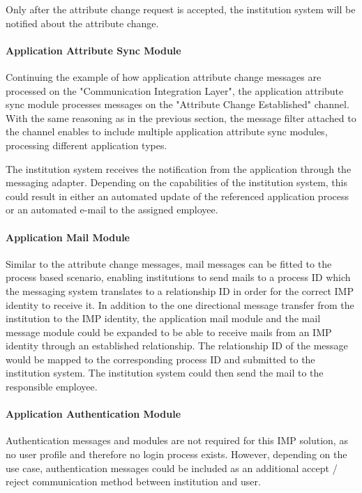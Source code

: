 Only after the attribute change request is accepted, the institution system will be notified about the attribute change.

\paragraph{Application Attribute Sync Module}

Continuing the example of how application attribute change messages are processed on the "Communication Integration Layer", the application attribute sync module processes messages on the "Attribute Change Established" channel. With the same reasoning as in the previous section, the message filter attached to the channel enables to include multiple application attribute sync modules, processing different application types.

The institution system receives the notification from the application through the messaging adapter. Depending on the capabilities of the institution system, this could result in either an automated update of the referenced application process or an automated e-mail to the assigned employee.

\paragraph{Application Mail Module}

Similar to the attribute change messages, mail messages can be fitted to the process based scenario, enabling institutions to send mails to a process ID which the messaging system translates to a relationship ID in order for the correct IMP identity to receive it. In addition to the one directional message transfer from the institution to the IMP identity, the application mail module and the mail message module could be expanded to be able to receive mails from an IMP identity through an established relationship. The relationship ID of the message would be mapped to the corresponding process ID and submitted to the institution system. The institution system could then send the mail to the responsible employee.

\paragraph{Application Authentication Module}

Authentication messages and modules are not required for this IMP solution, as no user profile and therefore no login process exists. However, depending on the use case, authentication messages could be included as an additional accept / reject communication method between institution and user.

